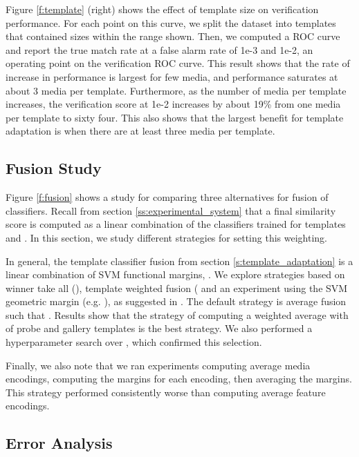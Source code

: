 \documentclass[10pt,twocolumn,letterpaper]{article}
\theoremstyle{definition}		\newtheorem{defn}[thm]{Definition}
\begin{document}
Figure \ref{f:template} (right) shows the effect of template size on verification performance.  For each point on this curve, we split the dataset into templates that contained sizes within the range shown.  Then, we computed a ROC curve and report the true match rate at a false alarm rate of 1e-3 and 1e-2, an operating point on the verification ROC curve.  This result shows that the rate of increase in performance is largest for few media, and performance saturates at about 3 media per template.  Furthermore, as the number of media per template increases, the verification score at 1e-2 increases by about 19\% from one media per template to sixty four.  This also shows that the largest benefit for template adaptation is when there are at least three media per template.  


\subsection{Fusion Study}
\label{ss:fusion}




Figure \ref{f:fusion} shows a study for comparing three alternatives for fusion of classifiers.  Recall from section \ref{ss:experimental_system} that a final similarity score is computed as a linear combination of the classifiers trained for templates  and .  In this section, we study different strategies for setting this weighting. 

In general, the template classifier fusion from section \ref{s:template_adaptation} is a linear combination of SVM functional margins,  .  We explore strategies based on winner take all (), template weighted fusion ( and an experiment using the SVM geometric margin (e.g. ), as suggested in \cite{Kobayashi15}.  The default strategy is average fusion such that .  Results show that the strategy of computing a weighted average with  of probe and gallery templates is the best strategy.  We also performed a hyperparameter search over , which confirmed this selection.  

Finally, we also note that we ran experiments computing average media encodings, computing the margins for each encoding, then averaging the margins.  This strategy performed consistently worse than computing average feature encodings.




\subsection{Error Analysis}
\label{ss:errors}
\end{document}
